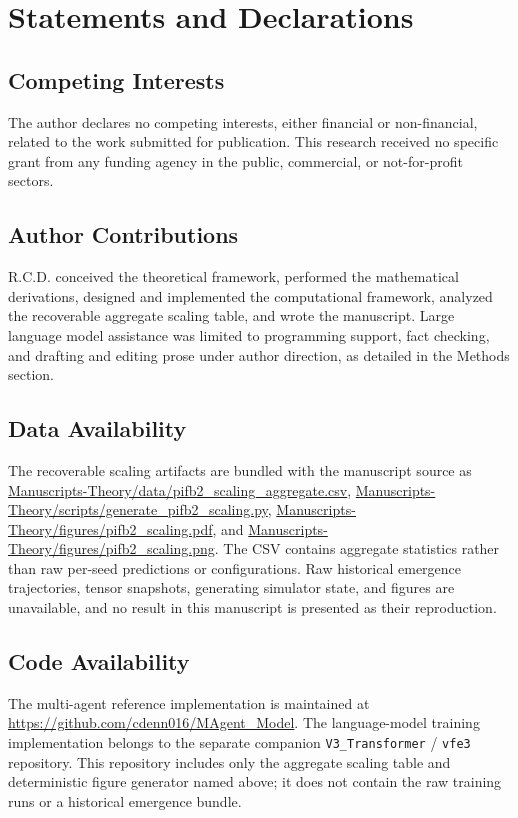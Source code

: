 \documentclass[11pt]{article}
\begin{document}
\section{Statements and Declarations}\label{sec:statements}

\subsection*{Competing Interests}
The author declares no competing interests, either financial or non-financial, related to the work submitted for publication. This research received no specific grant from any funding agency in the public, commercial, or not-for-profit sectors.

\subsection*{Author Contributions}
R.C.D. conceived the theoretical framework, performed the mathematical derivations, designed and implemented the computational framework, analyzed the recoverable aggregate scaling table, and wrote the manuscript. Large language model assistance was limited to programming support, fact checking, and drafting and editing prose under author direction, as detailed in the Methods section.

\subsection*{Data Availability}
The recoverable scaling artifacts are bundled with the manuscript source as \url{Manuscripts-Theory/data/pifb2_scaling_aggregate.csv}, \url{Manuscripts-Theory/scripts/generate_pifb2_scaling.py}, \url{Manuscripts-Theory/figures/pifb2_scaling.pdf}, and \url{Manuscripts-Theory/figures/pifb2_scaling.png}. The CSV contains aggregate statistics rather than raw per-seed predictions or configurations. Raw historical emergence trajectories, tensor snapshots, generating simulator state, and figures are unavailable, and no result in this manuscript is presented as their reproduction.

\subsection*{Code Availability}
The multi-agent reference implementation is maintained at \url{https://github.com/cdenn016/MAgent_Model}. The language-model training implementation belongs to the separate companion \texttt{V3\_Transformer} / \texttt{vfe3} repository. This repository includes only the aggregate scaling table and deterministic figure generator named above; it does not contain the raw training runs or a historical emergence bundle.
\end{document}
